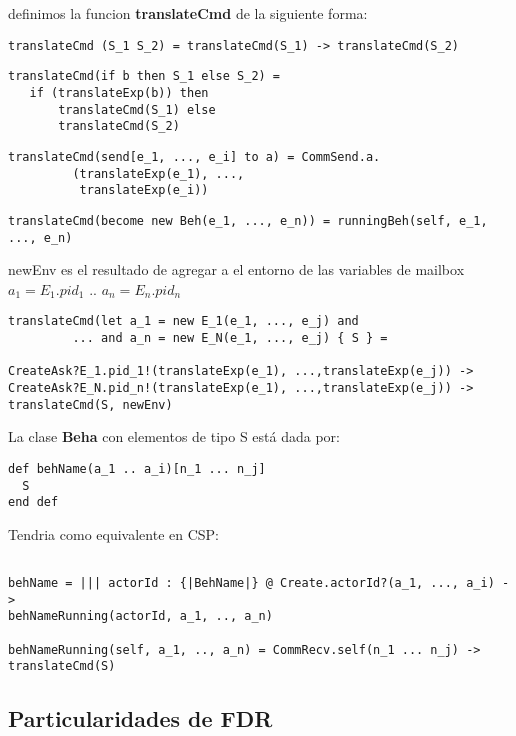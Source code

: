 definimos la funcion \textbf{translateCmd} de la siguiente forma:

\begin{verbatim}
translateCmd (S_1 S_2) = translateCmd(S_1) -> translateCmd(S_2)
\end{verbatim}


\begin{verbatim}
translateCmd(if b then S_1 else S_2) = 
   if (translateExp(b)) then
       translateCmd(S_1) else 
       translateCmd(S_2)
\end{verbatim}

\begin{verbatim}
translateCmd(send[e_1, ..., e_i] to a) = CommSend.a.
         (translateExp(e_1), ..., 
          translateExp(e_i)) 
\end{verbatim}

\begin{verbatim}
translateCmd(become new Beh(e_1, ..., e_n)) = runningBeh(self, e_1, ..., e_n)
\end{verbatim}

newEnv es el resultado de agregar a el entorno de las variables de mailbox $a_1
= E_1.pid_1$ .. $a_n = E_n.pid_n$
\begin{verbatim}
translateCmd(let a_1 = new E_1(e_1, ..., e_j) and 
         ... and a_n = new E_N(e_1, ..., e_j) { S } = 

CreateAsk?E_1.pid_1!(translateExp(e_1), ...,translateExp(e_j)) ->
CreateAsk?E_N.pid_n!(translateExp(e_1), ...,translateExp(e_j)) ->
translateCmd(S, newEnv)
\end{verbatim}


La clase \textbf{Beha} con elementos de tipo S está dada por:

\begin{verbatim}
def behName(a_1 .. a_i)[n_1 ... n_j]
  S
end def
\end{verbatim}

Tendria como equivalente en CSP:

\begin{verbatim}

behName = ||| actorId : {|BehName|} @ Create.actorId?(a_1, ..., a_i) ->
behNameRunning(actorId, a_1, .., a_n)

behNameRunning(self, a_1, .., a_n) = CommRecv.self(n_1 ... n_j) -> translateCmd(S)

\end{verbatim}

\subsection{Particularidades de FDR}


